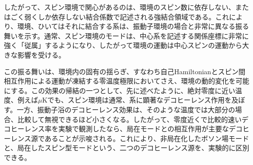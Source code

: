 したがって、スピン環境で関心があるのは、環境のスピン数に依存しない、またはごく弱くしか依存しない結合係数で記述される強結合領域である。これにより、環境、ひいてはそれに結合する系は、振動子環境の場合と非常に異なる振る舞いを示す。通常、スピン環境のモードは、中心系を記述する関係座標に非常に強く「従属」するようになり、したがって環境の運動は中心スピンの運動から大きな影響を受ける\cite{ref199}。

この振る舞いは、環境内の固有の揺らぎ、すなわち自己Hamiltonianとスピン間相互作用による運動が凍結する零温度極限においてさえ、環境の動的変化を可能にする。この効果の帰結の一つとして、先に述べたように、絶対零度に近い温度、例えば$\mu\mathrm K$でも、スピン環境は通常、系に顕著なデコヒーレンス作用を及ぼす。一方、振動子浴のデコヒーレンス効果は、そのような温度では大部分の場合、比較して無視できるほど小さくなる。したがって、零度近くで比較的速いデコヒーレンス率を実験で観測したなら、局在モードとの相互作用が主要なデコヒーレンス源であることが示唆される。これにより、非局在化したボソン場モードと、局在したスピン型モードという、二つのデコヒーレンス源を、実験的に区別できる。
